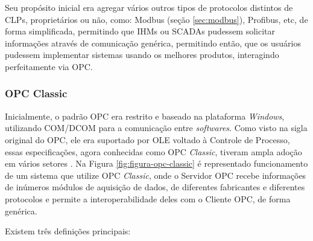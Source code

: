         Seu propósito inicial era agregar vários outros tipos de protocolos distintos de \glspl{CLP}, proprietários ou não, como: Modbus (seção \ref{sec:modbus}), Profibus, etc, de forma simplificada, permitindo que \glspl{IHM} ou \glspl{SCADA} pudessem solicitar informações através de comunicação genérica, permitindo então, que os usuários pudessem implementar sistemas usando os melhores produtos, interagindo perfeitamente via \gls{OPC}.

    \subsubsection{OPC Classic}
    \label{sec:opc-classic}

        Inicialmente, o padrão \gls{OPC} era restrito e baseado na plataforma \textit{Windows}, utilizando \gls{COM/DCOM} para a comunicação entre \textit{softwares}. Como visto na sigla original do \gls{OPC}, ele era suportado por \gls{OLE} voltado à Controle de Processo, essas especificações, agora conhecidas como \gls{OPC} \textit{Classic}, tiveram ampla adoção em vários setores \cite{OPCClassic}. Na Figura \ref{fig:figura-opc-classic} é representado funcionamento de um sistema que utilize \gls{OPC} \textit{Classic}, onde o Servidor \gls{OPC} recebe informações de inúmeros módulos de aquisição de dados, de diferentes fabricantes e diferentes protocolos e permite a interoperabilidade deles com o Cliente \gls{OPC}, de forma genérica.
                
        \begin{figure}[!h]
	    \end{figure}
	    
	    Existem três definições principais:
        
